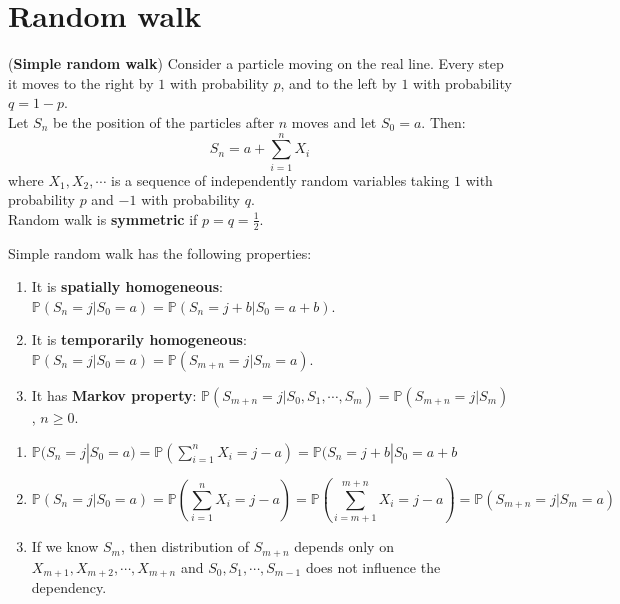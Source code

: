 \documentclass{huhtakm-template-book}
\newcommand{\prob}{\mathbb{P}}
\begin{document}
\appendix
\renewcommand{\thechapter}{\Alph{chapter}}
    
\chapter{Random walk}
\label{Simple random walk}
    \begin{eg}(\textbf{Simple random walk})
        Consider a particle moving on the real line. Every step it moves to the right by $1$ with probability $p$, and to the left by $1$ with probability $q=1-p$.\\
        Let $S_{n}$ be the position of the particles after $n$ moves and let $S_{0}=a$. Then:
        \begin{equation*}
            S_{n}=a+\sum_{i=1}^{n}X_{i}
        \end{equation*}
        where $X_{1},X_{2},\cdots$ is a sequence of independently random variables taking $1$ with probability $p$ and $-1$ with probability $q$.\\
        Random walk is \textbf{symmetric} if $p=q=\frac{1}{2}$.
    \end{eg}
    \begin{lem}
        \label{Simple random walk properties}
        Simple random walk has the following properties:
        \begin{enumerate}
            \item It is \textbf{spatially homogeneous}: $\prob(S_{n}=j|S_{0}=a)=\prob(S_{n}=j+b|S_{0}=a+b)$.
            \item It is \textbf{temporarily homogeneous}: $\prob(S_{n}=j|S_{0}=a)=\prob(S_{m+n}=j|S_{m}=a)$.
            \item It has \textbf{Markov property}: $\prob(S_{m+n}=j|S_{0},S_{1},\cdots,S_{m})=\prob(S_{m+n}=j|S_{m})$, $n\geq 0$.
        \end{enumerate}
    \end{lem}
    \begin{proofing}
            \begin{enumerate}
                \item $\prob(S_{n}=j|S_{0}=a)=\prob(\sum_{i=1}^{n}X_{i}=j-a)=\prob(S_{n}=j+b|S_{0}=a+b$
                \item 
                \begin{equation*}
                    \prob(S_{n}=j|S_{0}=a)=\prob\left(\sum_{i=1}^{n}X_{i}=j-a\right)=\prob\left(\sum_{i=m+1}^{m+n}X_{i}=j-a\right)=\prob(S_{m+n}=j|S_{m}=a)
                \end{equation*}
                \item If we know $S_{m}$, then distribution of $S_{m+n}$ depends only on $X_{m+1},X_{m+2},\cdots,X_{m+n}$ and $S_{0},S_{1},\cdots,S_{m-1}$ does not influence the dependency.
            \end{enumerate}
    \end{proofing}
\end{document}
